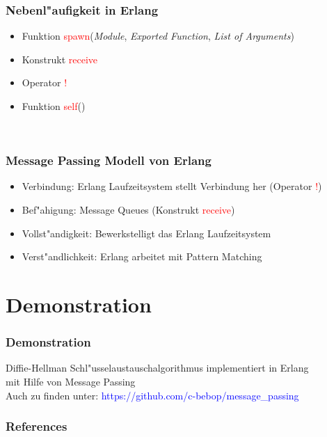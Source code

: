 \documentclass[aspectratio=169]{beamer}
\begin{document}
\begin{frame}

\frametitle{Nebenl"aufigkeit in Erlang}

\begin{itemize}

\item Funktion \textcolor{red}{spawn}(\textit{Module}, \textit{Exported Function}, \textit{List of Arguments})
\pause
\item Konstrukt \textcolor{red}{receive}
\pause
\item Operator \textcolor{red}{!}
\pause
\item Funktion \textcolor{red}{self}()

\end{itemize}

\begin{flushright}
\cite{erl_doc}\\
\cite{erl}
\end{flushright}

\end{frame}

\begin{frame}

\frametitle{Message Passing Modell von Erlang}

\begin{itemize}
\item Verbindung: Erlang Laufzeitsystem stellt Verbindung her (Operator \textcolor{red}{!})\\
\pause
\item Bef"ahigung: Message Queues (Konstrukt \textcolor{red}{receive})
\pause
\item Vollst"andigkeit: Bewerkstelligt das Erlang Laufzeitsystem
\pause
\item Verst"andlichkeit: Erlang arbeitet mit Pattern Matching
\end{itemize}

\end{frame}

\section{Demonstration}

\begin{frame}

\frametitle{Demonstration}

\begin{center}
Diffie-Hellman Schl"usselaustauschalgorithmus implementiert in Erlang\\
mit Hilfe von Message Passing\\
Auch zu finden unter: \textcolor{blue}{https://github.com/c-bebop/message\_passing}
\end{center}

\end{frame}

\begin{frame}

\frametitle{References}

\begin{tiny}




\end{tiny}

\end{frame}

\end{document}
